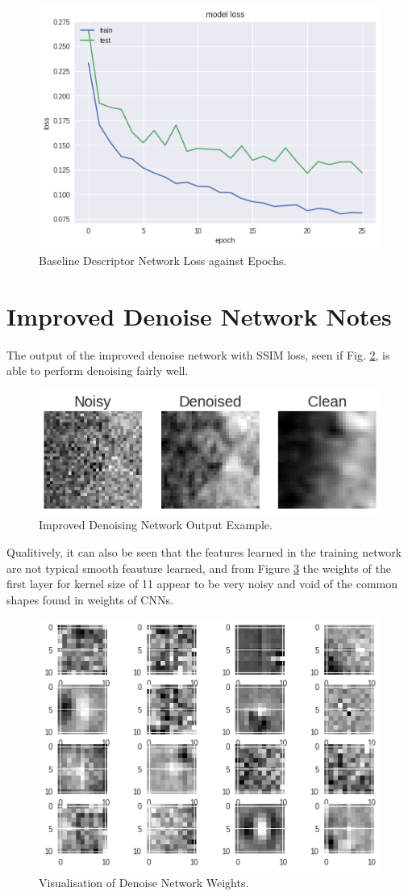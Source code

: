 \documentclass[10pt,twocolumn,letterpaper]{article}
\begin{document}
\begin{figure}[H]
\centering
  \includegraphics[width=0.65\linewidth]{figures/descriptor_train.png}
  \caption{Baseline Descriptor Network Loss against Epochs.}
  \label{fig:descriptor_loss}
\end{figure}

\section{Improved Denoise Network Notes}

The output of the improved denoise network with SSIM loss, seen if Fig. \ref{fig:denoise_image}, is able to perform denoising fairly well. 

\begin{figure}[H]
\centering
  \includegraphics[width=0.65\linewidth]{report/figures/denoise_image.png}
  \caption{Improved Denoising Network Output Example.}
  \label{fig:denoise_image}
\end{figure}

Qualitively, it can also be seen that the features learned in the training network are not typical smooth feauture learned, and from Figure \ref{fig:denoise_weights} the weights of the first layer for kernel size of 11 appear to be very noisy and void of the common shapes found in weights of CNNs.

\begin{figure}[H]
\centering
  \includegraphics[width=0.7\linewidth]{report/figures/denoise_weights.png}
  \caption{Visualisation of Denoise Network Weights.}
  \label{fig:denoise_weights}
\end{figure}
\end{document}

